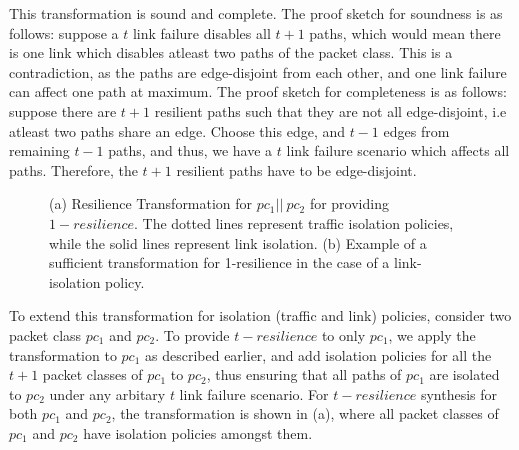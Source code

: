 This transformation is sound and complete. The proof sketch for soundness
 is as follows: suppose a $t$ link failure
disables all $t+1$ paths, which would mean there is one link which disables atleast two paths
of the packet class. This is a contradiction, as the paths are edge-disjoint from each other, and one
link failure can affect one path at maximum. The proof sketch for completeness is as follows:
suppose there are $t+1$ resilient paths such that they are not all edge-disjoint, i.e atleast two
paths share an edge. Choose this edge, and $t-1$ edges from remaining $t-1$ paths, and
thus, we have a $t$ link failure scenario which affects all paths. Therefore, the $t+1$ resilient
paths have to be edge-disjoint.
\begin{figure}
	\centering
	\caption{\label{fig:restransform}
		(a) Resilience Transformation for $pc_1 || \ pc_2$ for providing $1-resilience$. 
		The dotted lines represent traffic isolation policies, 
		while the solid lines represent link isolation. (b) Example of a sufficient transformation
		for 1-resilience in the case of a link-isolation policy.}
\end{figure}



To extend this transformation for isolation (traffic and link) policies, consider two packet class $pc_1$ 
and $pc_2$. 
To provide $t-resilience$ to only $pc_1$, we apply the transformation to $pc_1$ as described
earlier, and add isolation policies for all the $t+1$ packet classes of $pc_1$ to $pc_2$,
thus ensuring that all paths of $pc_1$ are isolated to $pc_2$ under any arbitary $t$ link 
failure scenario. For $t-resilience$ synthesis for both $pc_1$ and $pc_2$, the transformation
is shown in (a), where all packet classes of $pc_1$ and $pc_2$ have 
isolation policies amongst them. 

